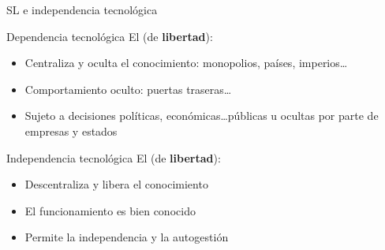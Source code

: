 \documentclass{beamer}
\begin{document}
\begin{frame}{SL e independencia tecnológica}
  \begin{alertblock}{Dependencia tecnológica}
    El  (de \textbf{libertad}):
    \begin{itemize}
    \item Centraliza y oculta el conocimiento: monopolios, países,             imperios\ldots
    \item Comportamiento oculto: puertas traseras\ldots
    \item Sujeto a decisiones políticas, económicas\ldots públicas u             ocultas por parte       de empresas y estados
    \end{itemize}
    
  \end{alertblock}

  \pause
  \begin{exampleblock}{Independencia tecnológica}
    El  (de \textbf{libertad}):
    \begin{itemize}
    \item Descentraliza y libera el conocimiento
    \item El funcionamiento es bien conocido
    \item Permite la independencia y la autogestión
    \end{itemize}
  \end{exampleblock}
\end{frame}
\end{document}
